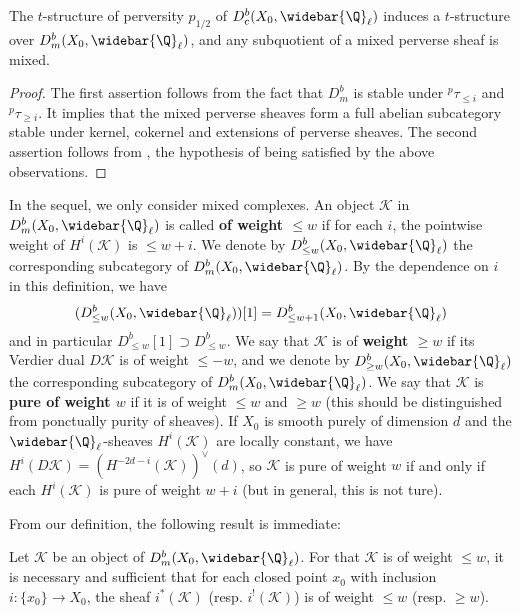 \begin{proposition}\label{scheme perverse structure on mixed cat}
The $t$-structure of perversity $p_{1/2}$ of $D^b_c(X_0,\widebar{\Q}_\ell)$ induces a $t$-structure over $D^b_m(X_0,\widebar{\Q}_\ell)$, and any subquotient of a mixed perverse sheaf is mixed.
\end{proposition}
\begin{proof}
The first assertion follows from the fact that $D^b_m$ is stable under ${^p\!\tau_{\leq i}}$ and ${^p\!\tau_{\geq i}}$. It implies that the mixed perverse sheaves form a full abelian subcategory stable under kernel, cokernel and extensions of perverse sheaves. The second assertion follows from \cite[5.1.4]{BBD}, the hypothesis of \cite[5.1.3]{BBD} being satisfied by the above observations.
\end{proof}

In the sequel, we only consider mixed complexes. An object $\mathscr{K}$ in $D^b_m(X_0,\widebar{\Q}_\ell)$ is called \textbf{of weight $\leq w$} if for each $i$, the pointwise weight of $H^i(\mathscr{K})$ is $\leq w+i$. We denote by $D^b_{\leq w}(X_0,\widebar{\Q}_\ell)$ the corresponding subcategory of $D^b_m(X_0,\widebar{\Q}_\ell)$. By the dependence on $i$ in this definition, we have
\[(D^b_{\leq w}(X_0,\widebar{\Q}_\ell))[1]=D^b_{\leq w+1}(X_0,\widebar{\Q}_\ell)\]
and in particular $D^b_{\leq w}[1]\supset D^b_{\leq w}$. We say that $\mathscr{K}$ is of \textbf{weight $\geq w$} if its Verdier dual $D\mathscr{K}$ is of weight $\leq -w$, and we denote by $D^b_{\geq w}(X_0,\widebar{\Q}_\ell)$ the corresponding subcategory of $D^b_m(X_0,\widebar{\Q}_\ell)$. We say that $\mathscr{K}$ is \textbf{pure of weight $w$} if it is of weight $\leq w$ and $\geq w$ (this should be distinguished from ponctually purity of sheaves). If $X_0$ is smooth purely of dimension $d$ and the $\widebar{\Q}_\ell$-sheaves $H^i(\mathscr{K})$ are locally constant, we have $H^i(D\mathscr{K})=(H^{-2d-i}(\mathscr{K}))^\vee(d)$, so $\mathscr{K}$ is pure of weight $w$ if and only if each $H^i(\mathscr{K})$ is pure of weight $w+i$ (but in general, this is not ture).

From our definition, the following result is immediate:

\begin{proposition}\label{scheme perverse pure of weight iff pullback to point}
Let $\mathscr{K}$ be an object of $D^b_m(X_0,\widebar{\Q}_\ell)$. For that $\mathscr{K}$ is of weight $\leq w$, it is necessary and sufficient that for each closed point $x_0$ with inclusion $i:\{x_0\}\to X_0$, the sheaf $i^*(\mathscr{K})$ (resp. $i^!(\mathscr{K})$) is of weight $\leq w$ (resp. $\geq w$).
\end{proposition}

